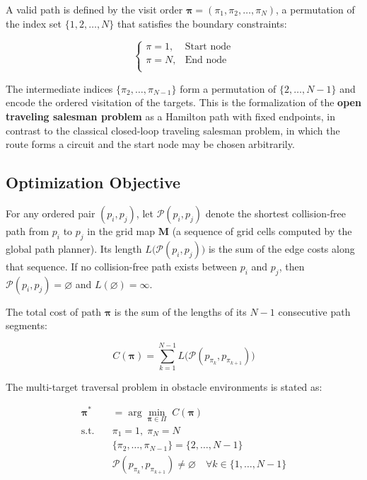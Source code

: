 A valid path is defined by the visit order $\bm{\pi} = (\pi_1, \pi_2, \dots, \pi_N)$, a permutation of the index set $\{1, 2, \dots, N\}$ that satisfies the boundary constraints:

\begin{equation}
\begin{cases}
\pi = 1, & \text{Start node} \\
\pi = N, & \text{End node} \\
\end{cases}
\label{eq:boundary}
\end{equation}

The intermediate indices $\{\pi_2, \dots, \pi_{N-1}\}$ form a permutation of $\{2, \dots, N-1\}$ and encode the ordered visitation of the targets. This is the formalization of the \textbf{open traveling salesman problem} as a Hamilton path with fixed endpoints, in contrast to the classical closed-loop traveling salesman problem, in which the route forms a circuit and the start node may be chosen arbitrarily\textcolor{blue}{\cite{ref4,ref36}}.

\subsection{Optimization Objective}

For any ordered pair $(p_i, p_j)$, let $\mathcal{P}(p_i, p_j)$ denote the shortest collision-free path from $p_i$ to $p_j$ in the grid map $\mathbf{M}$ (a sequence of grid cells computed by the global path planner). Its length $L\big(\mathcal{P}(p_i, p_j)\big)$ is the sum of the edge costs along that sequence. If no collision-free path exists between $p_i$ and $p_j$, then $\mathcal{P}(p_i, p_j) = \varnothing$ and $L(\varnothing) = \infty$.

The total cost of path $\bm{\pi}$ is the sum of the lengths of its $N-1$ consecutive path segments:

\begin{equation}
C(\bm{\pi}) = \sum_{k=1}^{N-1} L\big(\mathcal{P}(p_{\pi_k}, p_{\pi_{k+1}})\big)
\label{eq:totalcost}
\end{equation}

The multi-target traversal problem in obstacle environments is stated as:

\begin{align}
\bm{\pi}^{*} &= \arg\min_{\bm{\pi} \in \Pi} \; C(\bm{\pi})
\label{eq:opt}\\
\text{s.t.} \quad &\pi_1 = 1,\; \pi_N = N \nonumber\\
&\{\pi_2, \dots, \pi_{N-1}\} = \{2, \dots, N-1\} \nonumber\\
&\mathcal{P}(p_{\pi_k}, p_{\pi_{k+1}}) \neq \varnothing \quad \forall k \in \{1, \dots, N-1\} \nonumber
\end{align}


